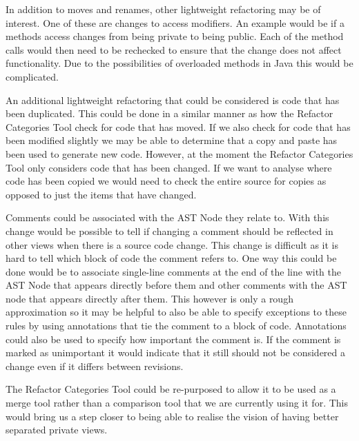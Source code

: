    

In addition to moves and renames, other lightweight refactoring may be of interest.
One of these are changes to access modifiers.
An example would be if a methods access changes from being private to being public.
Each of the method calls would then need to be rechecked to ensure that the change does not affect functionality.
Due to the possibilities of overloaded methods in Java this would be complicated.

An additional lightweight refactoring that could be considered is code that has been duplicated.
This could be done in a similar manner as how the Refactor Categories Tool check for code that has moved.
If we also check for code that has been modified slightly we may be able to determine that a copy and paste has been used to generate new code.
However, at the moment the Refactor Categories Tool only considers code that has been changed.
If we want to analyse where code has been copied we would need to check the entire source for copies as opposed to just the items that have changed.

Comments could be associated with the AST Node they relate to.  
With this change would be possible to tell if changing a comment should be reflected in other views when there is a source code change. 
This change is difficult as it is hard to tell which block of code the comment refers to.  
One way this could be done would be to associate single-line comments at the end of the line with the AST Node that appears directly before them and other comments with the AST node that appears directly after them.  
This however is only a rough approximation so it may be helpful to also be able to specify exceptions to these rules by using annotations that tie the comment to a block of code. Annotations could also be used to specify how important the comment is.
If the comment is marked as unimportant it would indicate that it still should not be considered a change even if it differs between revisions.

The Refactor Categories Tool could be re-purposed to allow it to be used as a merge tool rather than a comparison tool that we are currently using it for.  
This would bring us a step closer to being able to realise the vision of having better separated private views.  

